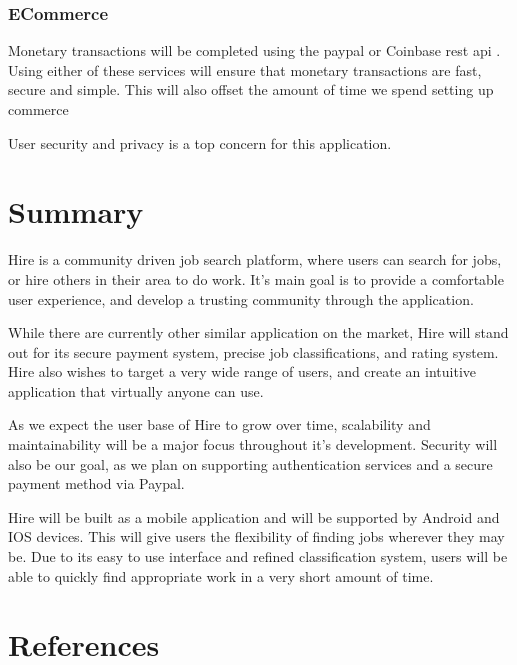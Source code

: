 \documentclass[11pt]{article}
\begin{document}
\subsubsection{ECommerce}

Monetary transactions will be completed using the \gls{paypal} or Coinbase \gls{rest} \gls{api} \cite{paypal}. Using either of these services will ensure that monetary transactions are fast, secure and simple. This will also offset the amount of time we spend setting up commerce

User security and privacy is a top concern for this application. 


%
\section{Summary}


Hire is a community driven job search platform, where users can search for jobs, or hire others in their area to do work. It's main goal is to provide a comfortable user experience, and develop a trusting community through the application.

While there are currently other similar application on the market, Hire will stand out for its secure payment system, precise job classifications, and rating system. Hire also wishes to target a very wide range of users, and create an intuitive application that virtually anyone can use.

As we expect the user base of Hire to grow over time, scalability and maintainability will be a major focus throughout it's development. Security will also be our goal, as we plan on supporting authentication services and a secure payment method via Paypal.

Hire will be built as a mobile application and will be supported by Android and IOS devices. This will give users the flexibility of finding jobs wherever they may be. Due to its easy to use interface and refined classification system, users will be able to quickly find appropriate work in a very short amount of time.

    
 
    \section{References} 
    
\end{document}

